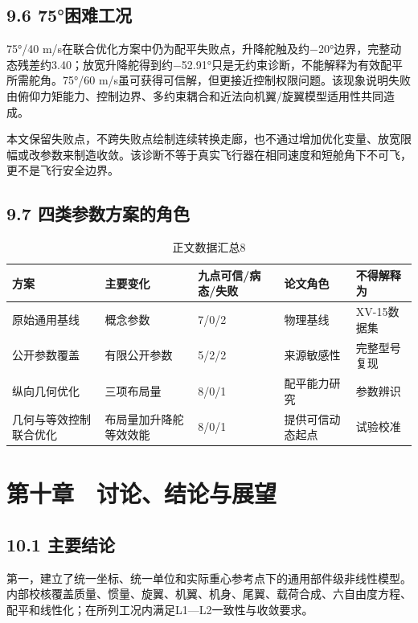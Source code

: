 \documentclass[UTF8,12pt,openany]{ctexbook}
\begin{document}
\section{9.6 75°困难工况}

75°/40 m/s在联合优化方案中仍为配平失败点，升降舵触及约−20°边界，完整动态残差约3.40；放宽升降舵得到约−52.91°只是无约束诊断，不能解释为有效配平所需舵角。75°/60 m/s虽可获得可信解，但更接近控制权限问题。该现象说明失败由俯仰力矩能力、控制边界、多约束耦合和近法向机翼/旋翼模型适用性共同造成。

本文保留失败点，不跨失败点绘制连续转换走廊，也不通过增加优化变量、放宽限幅或改参数来制造收敛。该诊断不等于真实飞行器在相同速度和短舱角下不可飞，更不是飞行安全边界。


\section{9.7 四类参数方案的角色}

\begin{longtable}{p{}p{}p{}p{}p{}}
\caption{正文数据汇总8}\label{tab:auto-8}\\
\toprule
方案 & 主要变化 & 九点可信/病态/失败 & 论文角色 & 不得解释为 \\
\midrule
原始通用基线 & 概念参数 & 7/0/2 & 物理基线 & XV-15数据集 \\
公开参数覆盖 & 有限公开参数 & 5/2/2 & 来源敏感性 & 完整型号复现 \\
纵向几何优化 & 三项布局量 & 8/0/1 & 配平能力研究 & 参数辨识 \\
几何与等效控制联合优化 & 布局量加升降舵等效效能 & 8/0/1 & 提供可信动态起点 & 试验校准 \\
\bottomrule
\end{longtable}


\chapter{第十章　讨论、结论与展望}

\section{10.1 主要结论}

第一，建立了统一坐标、统一单位和实际重心参考点下的通用部件级非线性模型。内部校核覆盖质量、惯量、旋翼、机翼、机身、尾翼、载荷合成、六自由度方程、配平和线性化；在所列工况内满足L1—L2一致性与收敛要求。
\end{document}
